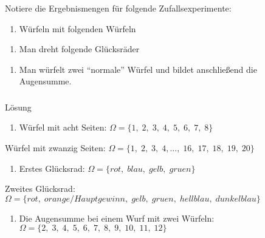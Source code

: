 \documentclass[
  ngerman,
]{book}
\providecommand{\tightlist}{%
  \setlength{\itemsep}{0pt}\setlength{\parskip}{0pt}}
\begin{document}
Notiere die Ergebnismengen für folgende Zufallsexperimente:

\begin{enumerate}
\def\labelenumi{\alph{enumi})}
\tightlist
\item
  Würfeln mit folgenden Würfeln
\end{enumerate}

\begin{enumerate}
\def\labelenumi{\alph{enumi})}
\setcounter{enumi}{1}
\tightlist
\item
  Man dreht folgende Glücksräder
\end{enumerate}

\begin{enumerate}
\def\labelenumi{\alph{enumi})}
\setcounter{enumi}{2}
\tightlist
\item
  Man würfelt zwei ``normale'' Würfel und bildet anschließend die Augensumme.
\end{enumerate}

\hypertarget{section-44}{%
\subsubsection*{}\label{section-44}}

Lösung

\begin{enumerate}
\def\labelenumi{\alph{enumi})}
\tightlist
\item
  Würfel mit acht Seiten: \(\Omega =\{1,\;2,\;3,\;4,\;5,\;6,\;7,\;8\}\)
\end{enumerate}

Würfel mit zwanzig Seiten: \(\Omega =\{1,\;2,\;3,\;4,...,\;16,\;17,\;18,\;19,\;20\}\)

\begin{enumerate}
\def\labelenumi{\alph{enumi})}
\setcounter{enumi}{1}
\tightlist
\item
  Erstes Glücksrad: \(\Omega = \{rot,\;blau,\;gelb,\;gruen \}\)
\end{enumerate}

Zweites Glücksrad: \(\Omega = \{rot,\;orange/Hauptgewinn,\;gelb,\;gruen,\;hellblau,\;dunkelblau \}\)

\begin{enumerate}
\def\labelenumi{\alph{enumi})}
\setcounter{enumi}{2}
\tightlist
\item
  Die Augensumme bei einem Wurf mit zwei Würfeln: \(\Omega =\{2,\;3,\;4,\;5,\;6,\;7,\;8,\;9,\;10,\;11,\;12\}\)
\end{enumerate}
\end{document}
